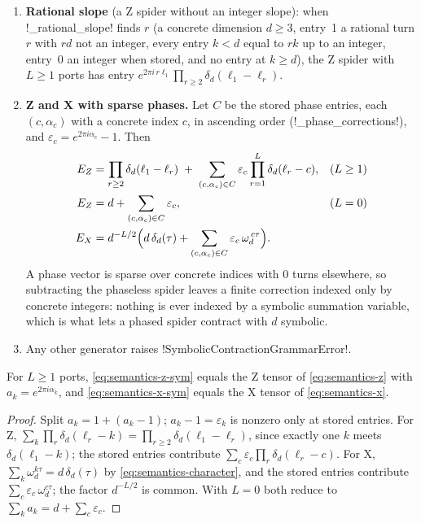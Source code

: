 \begin{enumerate}
\item \textbf{Rational slope} (a Z spider without an integer slope): when \py!_rational_slope! finds $r$ (a concrete dimension $d\ge3$, entry~1 a rational turn $r$ with $rd$ not an integer, every entry $k<d$ equal to $rk$ up to an integer, entry~0 an integer when stored, and no entry at $k\ge d$), the Z spider with $L\ge1$ ports has entry $e^{2\pi i\,r\ell_1}\prod_{r\ge2}\delta_d(\ell_1-\ell_r)$.
\item \textbf{Z and X with sparse phases.} Let $C$ be the stored phase entries, each $(c,\alpha_c)$ with a concrete index $c$, in ascending order (\py!_phase_corrections!), and $\varepsilon_c=e^{2\pi i\alpha_c}-1$. Then
\begin{align}
E_Z &= \prod_{r\ge 2}\delta_d(\ell_1-\ell_r) \;+\; \sum_{(c,\alpha_c)\in C}\varepsilon_c\prod_{r=1}^{L}\delta_d(\ell_r-c), &&(L\ge 1)\label{eq:semantics-z-sym}\\
E_Z &= d+\sum_{(c,\alpha_c)\in C}\varepsilon_c, &&(L=0)\notag\\
E_X &= d^{-L/2}\Bigl(d\,\delta_d(\tau)+\sum_{(c,\alpha_c)\in C}\varepsilon_c\,\omega_d^{\,c\tau}\Bigr).\label{eq:semantics-x-sym}
\end{align}
A phase vector is sparse over concrete indices with $0$ turns elsewhere, so subtracting the phaseless spider leaves a finite correction indexed only by concrete integers: nothing is ever indexed by a symbolic summation variable, which is what lets a phased spider contract with $d$ symbolic.
\item Any other generator raises \py!SymbolicContractionGrammarError!.
\end{enumerate}

\begin{proposition}\label{prop:semantics-sparse}
For $L\ge1$ ports, \cref{eq:semantics-z-sym} equals the Z tensor of \cref{eq:semantics-z} with $a_k=e^{2\pi i\alpha_k}$, and \cref{eq:semantics-x-sym} equals the X tensor of \cref{eq:semantics-x}.
\end{proposition}
\begin{proof}
Split $a_k=1+(a_k-1)$; $a_k-1=\varepsilon_k$ is nonzero only at stored entries. For Z, $\sum_k\prod_r\delta_d(\ell_r-k)=\prod_{r\ge2}\delta_d(\ell_1-\ell_r)$, since exactly one $k$ meets $\delta_d(\ell_1-k)$; the stored entries contribute $\sum_{c}\varepsilon_c\prod_r\delta_d(\ell_r-c)$. For X, $\sum_k\omega_d^{k\tau}=d\,\delta_d(\tau)$ by \cref{eq:semantics-character}, and the stored entries contribute $\sum_c\varepsilon_c\,\omega_d^{c\tau}$; the factor $d^{-L/2}$ is common. With $L=0$ both reduce to $\sum_k a_k=d+\sum_c\varepsilon_c$.
\end{proof}

